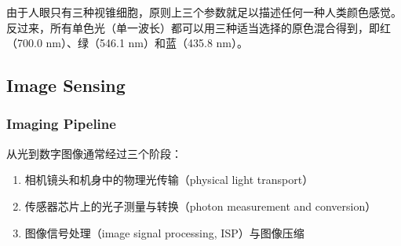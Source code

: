 由于人眼只有三种视锥细胞，原则上三个参数就足以描述任何一种人类颜色感觉。反过来，所有单色光（单一波长）都可以用三种适当选择的原色混合得到，即红（700.0 nm）、绿（546.1 nm）和蓝（435.8 nm）。

\subsection{Image Sensing}

\subsubsection{Imaging Pipeline}

从光到数字图像通常经过三个阶段：

\begin{enumerate}
    \item 相机镜头和机身中的物理光传输（physical light transport）
    \item 传感器芯片上的光子测量与转换（photon measurement and conversion）
    \item 图像信号处理（image signal processing, ISP）与图像压缩
\end{enumerate}

